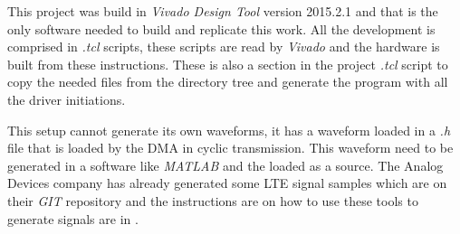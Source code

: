  This project was build in \emph{Vivado Design Tool} version 2015.2.1
\cite{xilinx:vivado} and that is the only software needed to build and
replicate this work. All the development is comprised in \emph{.tcl} scripts,
these scripts are read by \emph{Vivado} and the hardware is built from these
instructions. These is also a section in the project \emph{.tcl} script to copy
the needed files from the directory tree and generate the program with all the
driver initiations.

This setup cannot generate its own waveforms, it has a waveform loaded in a
\emph{.h} file that is loaded by the DMA in cyclic transmission. This waveform
need to be generated in a software like \emph{MATLAB} and the loaded as a
source. The Analog Devices company has already generated some LTE signal samples
which are on their \emph{GIT} repository \cite{web:gitanalogdevlte} and the
instructions are on how to use these tools to generate signals are in
\cite{web:analogmatlabwiki}.
